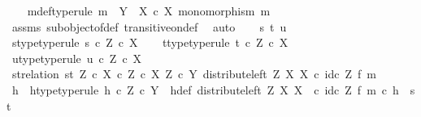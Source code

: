 \begin{isabellebody}
\isamarkupfalse%
\isanewline
\ \ \isamarkupfalse%
\ m{\isacharunderscore}{\kern0pt}def{\isacharbrackleft}{\kern0pt}type{\isacharunderscore}{\kern0pt}rule{\isacharbrackright}{\kern0pt}{\isacharcolon}{\kern0pt}\ {\isachardoublequoteopen}m\ {\isacharcolon}{\kern0pt}\ Y\ {\isasymrightarrow}\ X\ {\isasymtimes}\isactrlsub c\ X{\isachardoublequoteclose}\ {\isachardoublequoteopen}monomorphism\ m{\isachardoublequoteclose}\isanewline
\ \ \ \ \isamarkupfalse%
\ assms\ subobject{\isacharunderscore}{\kern0pt}of{\isacharunderscore}{\kern0pt}def{}\ transitive{\isacharunderscore}{\kern0pt}on{\isacharunderscore}{\kern0pt}def\ \isamarkupfalse%
\ auto\isanewline
\isanewline
\ \ \isamarkupfalse%
\ s\ t\ u\isanewline
\ \ \isamarkupfalse%
\ s{\isacharunderscore}{\kern0pt}type{\isacharbrackleft}{\kern0pt}type{\isacharunderscore}{\kern0pt}rule{\isacharbrackright}{\kern0pt}{\isacharcolon}{\kern0pt}\ {\isachardoublequoteopen}s\ {\isasymin}\isactrlsub c\ Z\ {\isasymtimes}\isactrlsub c\ X{\isachardoublequoteclose}\isanewline
\ \ \isamarkupfalse%
\ t{\isacharunderscore}{\kern0pt}type{\isacharbrackleft}{\kern0pt}type{\isacharunderscore}{\kern0pt}rule{\isacharbrackright}{\kern0pt}{\isacharcolon}{\kern0pt}\ {\isachardoublequoteopen}t\ {\isasymin}\isactrlsub c\ Z\ {\isasymtimes}\isactrlsub c\ X{\isachardoublequoteclose}\isanewline
\ \ \isamarkupfalse%
\ u{\isacharunderscore}{\kern0pt}type{\isacharbrackleft}{\kern0pt}type{\isacharunderscore}{\kern0pt}rule{\isacharbrackright}{\kern0pt}{\isacharcolon}{\kern0pt}\ {\isachardoublequoteopen}u\ {\isasymin}\isactrlsub c\ Z\ {\isasymtimes}\isactrlsub c\ X{\isachardoublequoteclose}\isanewline
\ \ \isamarkupfalse%
\ st{\isacharunderscore}{\kern0pt}relation{\isacharcolon}{\kern0pt}\ {\isachardoublequoteopen}{\isasymlangle}s{\isacharcomma}{\kern0pt}t{\isasymrangle}\ {\isasymin}\isactrlbsub {\isacharparenleft}{\kern0pt}Z\ {\isasymtimes}\isactrlsub c\ X{\isacharparenright}{\kern0pt}\ {\isasymtimes}\isactrlsub c\ Z\ {\isasymtimes}\isactrlsub c\ X\isactrlesub \ {\isacharparenleft}{\kern0pt}Z\ {\isasymtimes}\isactrlsub c\ Y{\isacharcomma}{\kern0pt}\ distribute{\isacharunderscore}{\kern0pt}left\ Z\ X\ X\ {\isasymcirc}\isactrlsub c\ id\isactrlsub c\ Z\ {\isasymtimes}\isactrlsub f\ m{\isacharparenright}{\kern0pt}{\isachardoublequoteclose}\isanewline
\ \ \isamarkupfalse%
\ \isamarkupfalse%
\ h\ \ h{\isacharunderscore}{\kern0pt}type{\isacharbrackleft}{\kern0pt}type{\isacharunderscore}{\kern0pt}rule{\isacharbrackright}{\kern0pt}{\isacharcolon}{\kern0pt}\ {\isachardoublequoteopen}h\ {\isasymin}\isactrlsub c\ Z\ {\isasymtimes}\isactrlsub c\ Y{\isachardoublequoteclose}\ \ h{\isacharunderscore}{\kern0pt}def{\isacharcolon}{\kern0pt}\ {\isachardoublequoteopen}{\isacharparenleft}{\kern0pt}distribute{\isacharunderscore}{\kern0pt}left\ Z\ X\ X\ \ {\isasymcirc}\isactrlsub c\ id\isactrlsub c\ Z\ {\isasymtimes}\isactrlsub f\ m{\isacharparenright}{\kern0pt}\ {\isasymcirc}\isactrlsub c\ h\ {\isacharequal}{\kern0pt}\ {\isasymlangle}s{\isacharcomma}{\kern0pt}t{\isasymrangle}{\isachardoublequoteclose}\isanewline

\end{isabellebody}
